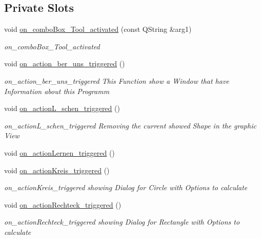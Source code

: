 \subsection*{Private Slots}
\begin{DoxyCompactItemize}
\item 
void \mbox{\hyperlink{class_main_window_a1b5f937fcb725434e148ef777c706ae5}{on\+\_\+combo\+Box\+\_\+\+Tool\+\_\+activated}} (const Q\+String \&arg1)
\begin{DoxyCompactList}\small\item\em on\+\_\+combo\+Box\+\_\+\+Tool\+\_\+activated \end{DoxyCompactList}\item 
void \mbox{\hyperlink{class_main_window_abfc114d19ba20fd03b5250ab9bcd6800}{on\+\_\+action\+\_\+ber\+\_\+uns\+\_\+triggered}} ()
\begin{DoxyCompactList}\small\item\em on\+\_\+action\+\_\+ber\+\_\+uns\+\_\+triggered This Function show a Window that have Information about this Programm \end{DoxyCompactList}\item 
void \mbox{\hyperlink{class_main_window_ab3399cf2708da3c92752eee1464b6dac}{on\+\_\+action\+L\+\_\+schen\+\_\+triggered}} ()
\begin{DoxyCompactList}\small\item\em on\+\_\+action\+L\+\_\+schen\+\_\+triggered Removing the current showed Shape in the graphic View \end{DoxyCompactList}\item 
void \mbox{\hyperlink{class_main_window_aba127199cc0e49feec72b68cc89caa73}{on\+\_\+action\+Lernen\+\_\+triggered}} ()
\item 
void \mbox{\hyperlink{class_main_window_a8a59ece8b287b2eea2eba497863e65a2}{on\+\_\+action\+Kreis\+\_\+triggered}} ()
\begin{DoxyCompactList}\small\item\em on\+\_\+action\+Kreis\+\_\+triggered showing Dialog for Circle with Options to calculate \end{DoxyCompactList}\item 
void \mbox{\hyperlink{class_main_window_ada63622ae1c854de4bb80282e490eb14}{on\+\_\+action\+Rechteck\+\_\+triggered}} ()
\begin{DoxyCompactList}\small\item\em on\+\_\+action\+Rechteck\+\_\+triggered showing Dialog for Rectangle with Options to calculate \end{DoxyCompactList}\item 

\end{DoxyCompactItemize}
